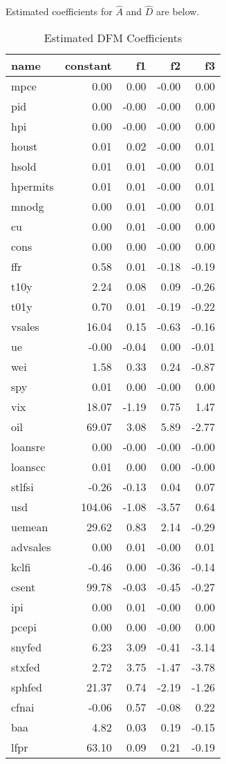 \documentclass[11pt, letterpaper]{article}\usepackage[]{graphicx}\usepackage[]{color}
\begin{document}
Estimated coefficients for $\widehat{A}$ and $\widehat{D}$ are below.
\begin{table}[H]
\centering
\begingroup\footnotesize
\begin{tabular}{lrrrr}
  \hline
name & constant & f1 & f2 & f3 \\ 
  \hline
mpce & 0.00 & 0.00 & -0.00 & 0.00 \\ 
  pid & 0.00 & -0.00 & -0.00 & 0.00 \\ 
  hpi & 0.00 & -0.00 & -0.00 & 0.00 \\ 
  houst & 0.01 & 0.02 & -0.00 & 0.01 \\ 
  hsold & 0.01 & 0.01 & -0.00 & 0.01 \\ 
  hpermits & 0.01 & 0.01 & -0.00 & 0.01 \\ 
  mnodg & 0.00 & 0.01 & -0.00 & 0.01 \\ 
  cu & 0.00 & 0.01 & -0.00 & 0.00 \\ 
  cons & 0.00 & 0.00 & -0.00 & 0.00 \\ 
  ffr & 0.58 & 0.01 & -0.18 & -0.19 \\ 
  t10y & 2.24 & 0.08 & 0.09 & -0.26 \\ 
  t01y & 0.70 & 0.01 & -0.19 & -0.22 \\ 
  vsales & 16.04 & 0.15 & -0.63 & -0.16 \\ 
  ue & -0.00 & -0.04 & 0.00 & -0.01 \\ 
  wei & 1.58 & 0.33 & 0.24 & -0.87 \\ 
  spy & 0.01 & 0.00 & -0.00 & 0.00 \\ 
  vix & 18.07 & -1.19 & 0.75 & 1.47 \\ 
  oil & 69.07 & 3.08 & 5.89 & -2.77 \\ 
  loansre & 0.00 & -0.00 & -0.00 & -0.00 \\ 
  loanscc & 0.01 & 0.00 & 0.00 & -0.00 \\ 
  stlfsi & -0.26 & -0.13 & 0.04 & 0.07 \\ 
  usd & 104.06 & -1.08 & -3.57 & 0.64 \\ 
  uemean & 29.62 & 0.83 & 2.14 & -0.29 \\ 
  advsales & 0.00 & 0.01 & -0.00 & 0.01 \\ 
  kclfi & -0.46 & 0.00 & -0.36 & -0.14 \\ 
  csent & 99.78 & -0.03 & -0.45 & -0.27 \\ 
  ipi & 0.00 & 0.01 & -0.00 & 0.00 \\ 
  pcepi & 0.00 & 0.00 & -0.00 & 0.00 \\ 
  snyfed & 6.23 & 3.09 & -0.41 & -3.14 \\ 
  stxfed & 2.72 & 3.75 & -1.47 & -3.78 \\ 
  sphfed & 21.37 & 0.74 & -2.19 & -1.26 \\ 
  cfnai & -0.06 & 0.57 & -0.08 & 0.22 \\ 
  baa & 4.82 & 0.03 & 0.19 & -0.15 \\ 
  lfpr & 63.10 & 0.09 & 0.21 & -0.19 \\ 
   \hline
\end{tabular}
\endgroup
\caption{Estimated DFM Coefficients} 
\end{table}
\end{document}
